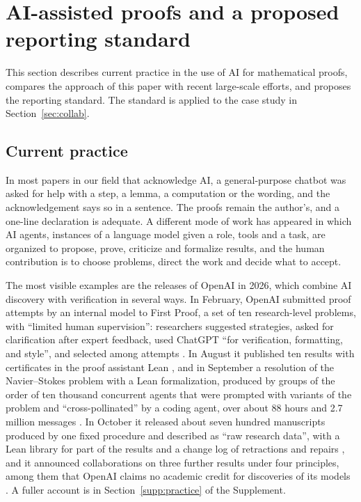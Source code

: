 \section{AI-assisted proofs and a proposed reporting standard}\label{sec:standard}

This section describes current practice in the use of AI for mathematical proofs, compares the approach of this
paper with recent large-scale efforts, and proposes the reporting standard. The standard is applied to the case
study in Section~\ref{sec:collab}.

\subsection{Current practice}\label{sec:std-practice}

In most papers in our field that acknowledge AI, a general-purpose chatbot was asked for help with a step, a lemma,
a computation or the wording, and the acknowledgement says so in a sentence. The proofs remain the author's, and a
one-line declaration is adequate. A different mode of work has appeared in which AI agents, instances of a language
model given a role, tools and a task, are organized to propose, prove, criticize and formalize results, and the
human contribution is to choose problems, direct the work and decide what to accept.

The most visible examples are the releases of OpenAI in 2026, which combine AI discovery with verification in several
ways. In February, OpenAI submitted proof attempts by an internal model to First Proof, a set of ten research-level
problems, with ``limited human supervision'': researchers suggested strategies, asked for clarification after expert
feedback, used ChatGPT ``for verification, formatting, and style'', and selected among attempts
\citep{openai_firstproof_2026}. In August it published ten results with certificates in the proof assistant Lean
\citep{openai_tenproofs_2026}, and in September a resolution of the Navier--Stokes problem with a Lean formalization,
produced by groups of the order of ten thousand concurrent agents that were prompted with variants of the problem and
``cross-pollinated'' by a coding agent, over about 88 hours and 2.7 million messages
\citep{openai_navierstokes_2026}. In October it released about seven hundred manuscripts produced by one fixed
procedure and described as ``raw research data'', with a Lean library for part of the results and a change log of
retractions and repairs \citep{openai_math_2026}, and it announced collaborations on three further results under four
principles, among them that OpenAI claims no academic credit for discoveries of its models
\citep{openai_academic_2026}. A fuller account is in Section~\ref{supp:practice} of the Supplement.

